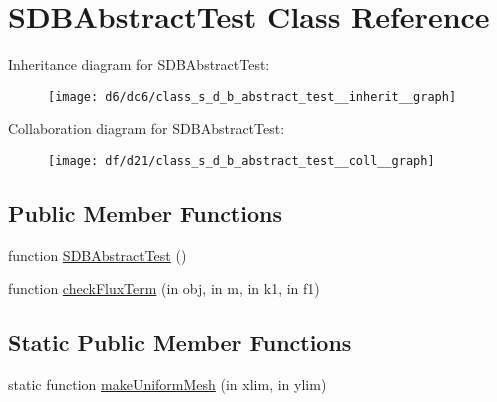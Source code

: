 \hypertarget{class_s_d_b_abstract_test}{}\section{S\+D\+B\+Abstract\+Test Class Reference}
\label{class_s_d_b_abstract_test}


Inheritance diagram for S\+D\+B\+Abstract\+Test\+:
\nopagebreak
\begin{figure}[H]
\begin{center}
\leavevmode
\texttt{[image: d6/dc6/class\_s\_d\_b\_abstract\_test\_\_inherit\_\_graph]}
\end{center}
\end{figure}


Collaboration diagram for S\+D\+B\+Abstract\+Test\+:
\nopagebreak
\begin{figure}[H]
\begin{center}
\leavevmode
\texttt{[image: df/d21/class\_s\_d\_b\_abstract\_test\_\_coll\_\_graph]}
\end{center}
\end{figure}
\subsection*{Public Member Functions}
\begin{DoxyCompactItemize}
\item 
function \hyperlink{class_s_d_b_abstract_test_ad966b076c87655495911eb92b6723f64}{S\+D\+B\+Abstract\+Test} ()
\item 
function \hyperlink{class_s_d_b_abstract_test_aa7e16236e7fb4a03ed6e728e53ab8862}{check\+Flux\+Term} (in obj, in m, in k1, in f1)
\end{DoxyCompactItemize}
\subsection*{Static Public Member Functions}
\begin{DoxyCompactItemize}
\item 
static function \hyperlink{class_s_d_b_abstract_test_a9d7b65ebcad032cbc165d1009c631a08}{make\+Uniform\+Mesh} (in xlim, in ylim)
\end{DoxyCompactItemize}
